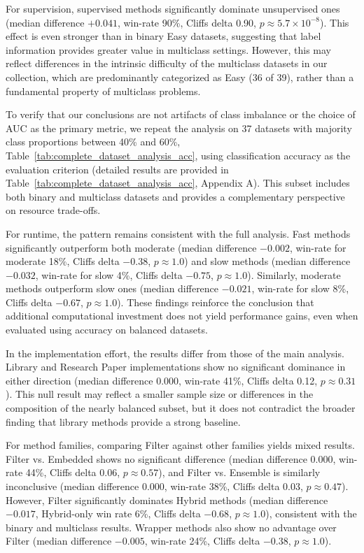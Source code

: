 \documentclass[preprint,12pt,authoryear]{elsarticle}
\begin{document}
{For supervision, supervised methods significantly dominate unsupervised ones (median difference $+0.041$, win-rate 90\%, Cliffs delta 0.90, $p \approx 5.7 \times 10^{-8}$). This effect is even stronger than in binary Easy datasets, suggesting that label information provides greater value in multiclass settings. However, this may reflect differences in the intrinsic difficulty of the multiclass datasets in our collection, which are predominantly categorized as Easy (36 of 39), rather than a fundamental property of multiclass problems.

To verify that our conclusions are not artifacts of class imbalance or the choice of AUC as the primary metric, we repeat the analysis on 37 datasets with majority class proportions between 40\% and 60\%, Table~\ref{tab:complete_dataset_analysis_acc}, using classification accuracy as the evaluation criterion (detailed results are provided in Table~\ref{tab:complete_dataset_analysis_acc}, Appendix A). This subset includes both binary and multiclass datasets and provides a complementary perspective on resource trade-offs.

For runtime, the pattern remains consistent with the full analysis. Fast methods significantly outperform both moderate (median difference $-0.002$, win-rate for moderate 18\%, Cliffs delta $-0.38$, $p \approx 1.0$) and slow methods (median difference $-0.032$, win-rate for slow 4\%, Cliffs delta $-0.75$, $p \approx 1.0$). Similarly, moderate methods outperform slow ones (median difference $-0.021$, win-rate for slow 8\%, Cliffs delta $-0.67$, $p \approx 1.0$). These findings reinforce the conclusion that additional computational investment does not yield performance gains, even when evaluated using accuracy on balanced datasets.

In the implementation effort, the results differ from those of the main analysis. Library and Research Paper implementations show no significant dominance in either direction (median difference $0.000$, win-rate 41\%, Cliffs delta 0.12, $p \approx 0.31$). This null result may reflect a smaller sample size or differences in the composition of the nearly balanced subset, but it does not contradict the broader finding that library methods provide a strong baseline.

For method families, comparing Filter against other families yields mixed results. Filter vs. Embedded shows no significant difference (median difference $0.000$, win-rate 44\%, Cliffs delta 0.06, $p \approx 0.57$), and Filter vs. Ensemble is similarly inconclusive (median difference $0.000$, win-rate 38\%, Cliffs delta 0.03, $p \approx 0.47$). However, Filter significantly dominates Hybrid methods (median difference $-0.017$, Hybrid-only win rate 6\%, Cliffs delta $-0.68$, $p \approx 1.0$), consistent with the binary and multiclass results. Wrapper methods also show no advantage over Filter (median difference $-0.005$, win-rate 24\%, Cliffs delta $-0.38$, $p \approx 1.0$).

}
\end{document}
